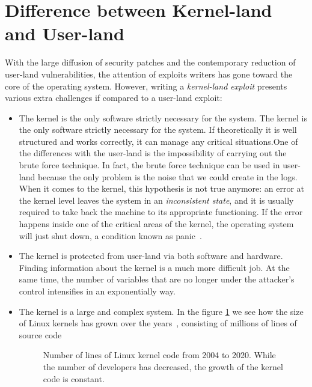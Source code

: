 \documentclass{masterthesis}
\begin{document}
\section{Difference between Kernel-land and User-land}
\label{sect:land}
With the large diffusion of security patches and the contemporary reduction of user-land vulnerabilities, the attention of exploits writers has gone toward the core of the operating system.
However, writing a \emph{kernel-land exploit} presents various extra challenges if compared to a user-land exploit:
\begin{itemize}
\item The kernel is the only software strictly necessary for the system. The kernel is the only software strictly necessary for the system. If theoretically it is well structured and works correctly, it can manage any critical situations.One of the differences with the user-land is the impossibility of carrying out the brute force technique. In fact, the brute force technique can be used in user-land because the only problem is the noise that we could create in the logs.
When it comes to the kernel, this hypothesis is not true anymore: an error at the kernel level leaves the system in an \emph{inconsistent state}, and it is usually required to take back the machine to its appropriate functioning.
If the error happens inside one of the critical areas of the kernel, the operating system will just shut down, a condition known as panic~\cite{cheng2021kernel}.
\item The kernel is protected from user-land via both software and hardware. Finding information about the kernel is a much more difficult job. At the same time, the number of variables that are no longer under the attacker’s control intensifies in an exponentially way. 
\item The kernel is a large and complex system. In the figure \ref{figure:line_code_graphview} we see how the size of Linux kernels has grown over the years~\cite{codeLinux}, consisting of millions of lines of source code
\begin{figure}[h!]
  \caption{Number of lines of Linux kernel code from 2004 to 2020. While the number of developers has decreased, the growth of the kernel code is constant.}\label{figure:line_code_graphview}
\end{figure} 
\end{itemize}
\end{document}
